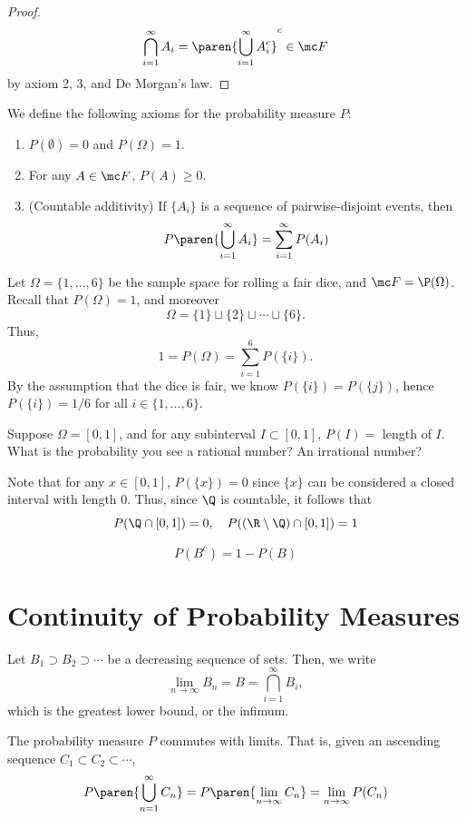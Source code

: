 \documentclass[11pt]{article}
\begin{document}
\begin{proof}
    $$\bigcap _{i=1}^\infty A_i = \paren{\bigcup _{i=1}^\infty A_i^c}^c \in \mc F$$
    by axiom 2, 3, and De Morgan's law.
\end{proof}

\begin{defn}
    We define the following axioms for the probability measure $P$:
    \begin{enumerate}
        \item $P(\emptyset) =0$ and $P(\Omega) = 1$.
        \item For any $A \in \mc F$, $P(A) \geq 0$.
        \item (Countable additivity) If $\{A_i\}$ is a sequence of pairwise-disjoint events, then
        $$P\paren{\bigcup_{i=1}^\infty A_i}=\sum_{i=1}^\infty P(A_i)$$
    \end{enumerate}
\end{defn}

\begin{ex}
    Let $\Omega = \{1,\dots,6\}$ be the sample space for rolling a fair dice, and $\mc F = \P(\Omega)$. Recall that $P(\Omega)=1$, and moreover
    $$\Omega = \{1\} \sqcup \{2\} \sqcup \cdots \sqcup \{6\}.$$
    Thus,
    $$1 = P(\Omega) = \sum_{i=1}^6P(\{i\}).$$
    By the assumption that the dice is fair, we know $P(\{i\}) = P(\{j\})$, hence $P(\{i\}) = 1/6$ for all $i \in \{1,\dots,6\}$.
\end{ex}

\begin{ex}
    Suppose $\Omega = [0,1]$, and for any subinterval $I \subset [0,1]$, $P(I)=$ length of $I$. What is the probability you see a rational number? An irrational number?

    Note that for any $x \in [0,1]$, $P(\{x\})=0$ since $\{x\}$ can be considered a closed interval with length $0$. Thus, since $\Q$ is countable, it follows that $$P(\Q \cap [0,1])=0, \quad P((\R\setminus \Q) \cap [0,1]) = 1$$
\end{ex}

\begin{prop}
    $$P(B^c) = 1-P(B)$$
\end{prop}

\section{Continuity of Probability Measures}

Let $B_1 \supset B_2 \supset \cdots$ be a decreasing sequence of sets. Then, we write
$$\lim_{n \to \infty}B_n = B=\bigcap_{i=1}^\infty B_i,$$
which is the greatest lower bound, or the infimum.
\begin{thm}
    The probability measure $P$ commutes with limits. That is, given an ascending sequence $C_1 \subset C_2 \subset \cdots$,
    $$P\paren{\bigcup_{n=1}^\infty C_n}=P\paren{\lim_{n \to \infty}C_n}=\lim_{n\to \infty}P(C_n)$$
\end{thm}
\end{document}
